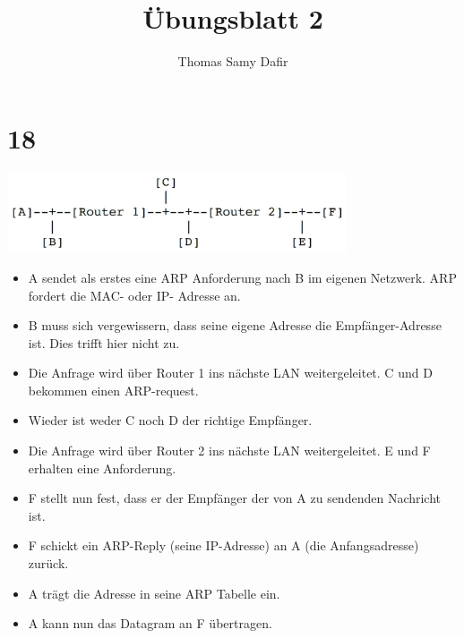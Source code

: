 \documentclass[12pt, a4paper]{article}
\title{Übungsblatt 2}
\author{Thomas Samy Dafir}
\date{}
\begin{document}
	\section{18}
	\includegraphics[width = 10cm]{18.jpg}
	\begin{itemize}
		\item A sendet als erstes eine ARP Anforderung nach B im eigenen Netzwerk. ARP fordert die MAC- oder IP-
			Adresse an.
		\item B muss sich vergewissern, dass seine eigene Adresse die Empfänger-Adresse ist. Dies trifft hier nicht zu.
		\item Die Anfrage wird über Router 1 ins nächste LAN weitergeleitet. C und D bekommen einen ARP-request.
		\item Wieder ist weder C noch D der richtige Empfänger.
		\item Die Anfrage wird über Router 2 ins nächste LAN weitergeleitet. E und F erhalten eine Anforderung.
		\item F stellt nun fest, dass er der Empfänger der von A zu sendenden Nachricht ist.
		\item F schickt ein ARP-Reply (seine IP-Adresse) an A (die Anfangsadresse) zurück.
		\item A trägt die Adresse in seine ARP Tabelle ein.
		\item A kann nun das Datagram an F übertragen.
	\end{itemize}
	
\end{document}
